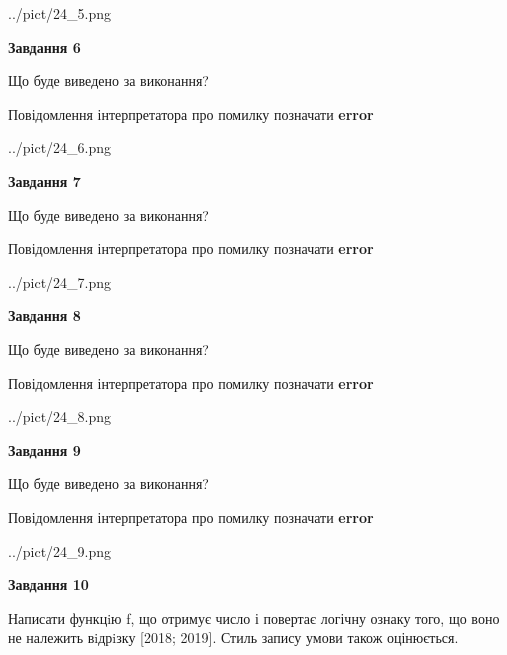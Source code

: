 \documentclass[12pt, ukrainian]{article}
\begin{document}
{\begin {large}
\begin{center}
	{../pict/24_5.png}
\end{center}
\newpage

{\begin {center}\textbf{Завдання 6}\end {center}}\par
Що буде виведено за виконання? \par
Повідомлення інтерпретатора про помилку позначати \textbf{error}

\begin{center}
	{../pict/24_6.png}
\end{center}
\newpage

{\begin {center}\textbf{Завдання 7}\end {center}}\par
Що буде виведено за виконання? \par
Повідомлення інтерпретатора про помилку позначати \textbf{error}

\begin{center}
	{../pict/24_7.png}
\end{center}
\newpage

{\begin {center}\textbf{Завдання 8}\end {center}}\par
Що буде виведено за виконання? \par
Повідомлення інтерпретатора про помилку позначати \textbf{error}

\begin{center}
	{../pict/24_8.png}
\end{center}
\newpage

{\begin {center}\textbf{Завдання 9}\end {center}}\par
Що буде виведено за виконання? \par
Повідомлення інтерпретатора про помилку позначати \textbf{error}

\begin{center}
	{../pict/24_9.png}
\end{center}
\newpage

{\begin {center}\textbf{Завдання 10}\end {center}}\par

Написати функцiю f, що отримує число і повертає логічну ознаку того, що воно не належить вiдрiзку [2018; 2019]. Стиль запису умови також оцінюється.\par
\newpage

\end {large}}
\end{document}
